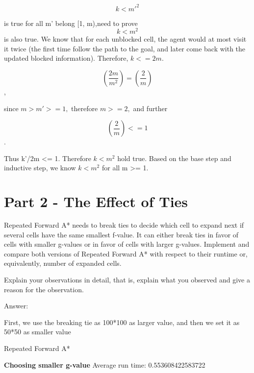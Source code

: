 \documentclass{article}
\begin{document}
$$k < m'^2$$
 
is true for all  m' belong [1, m),need to prove $$k < m^2$$ is also true. We know that for each unblocked cell, the agent would at most visit it twice (the first time follow the path to the goal, and later come back with the updated blocked information). Therefore, $k <= 2m.$ 

$$(\frac{2m}{m^2}) = (\frac{2}{m})$$, 

since $m > m' >= 1,$ therefore $m >= 2,$ and further 

$$(\frac{2}{m}) <= 1$$. 

Thus k'/2m <= 1. Therefore $k < m^2$ hold true.
Based on the base step and inductive step, we know $k < m^2$ for all m >= 1.




\section{Part 2 - The Effect of Ties}

Repeated Forward A* needs to break ties to decide which cell to expand next if
several cells have the same smallest f-value. It can either break ties in favor of cells with smaller g-values or in favor of
cells with larger g-values. Implement and compare both versions of Repeated Forward A* with respect to their runtime or,
equivalently, number of expanded cells.


\begin{question}
	Explain your observations in detail, that is, explain what you observed and give a
reason for the observation.

\end{question}

Answer: \newline
\par First, we use the breaking tie as 100*100 as larger value, and then we set it as 50*50 as smaller value

Repeated Forward A*

\textbf{Choosing smaller g-value}
Average run time: 0.553608422583722
\end{document}
